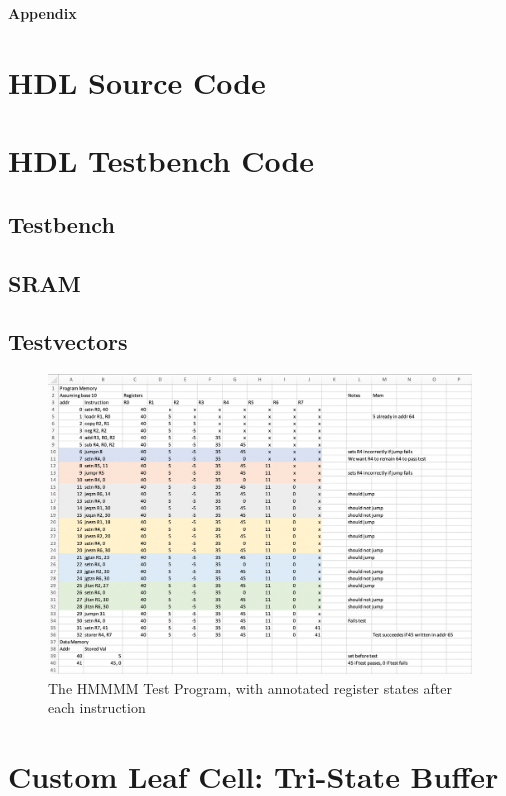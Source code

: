 \documentclass[12pt]{article}
\begin{document}
\clearpage
\begin{appendices}
    \LARGE\textbf{Appendix}
    \section{HDL Source Code}
    \section{HDL Testbench Code}
    \clearpage
    \subsection{Testbench}
    \clearpage
    \subsection{SRAM}
    \clearpage
    \subsection{Testvectors}
    \begin{figure}[H]
        \begin{center}
        \includegraphics[width=16cm]{HMMMTestvectors.png}
        \caption{The HMMMM Test Program, with annotated register states after each instruction}
        \end{center}
    \end{figure}
    \clearpage
    \section{Custom Leaf Cell: Tri-State Buffer}

\end{appendices}
\end{document}
